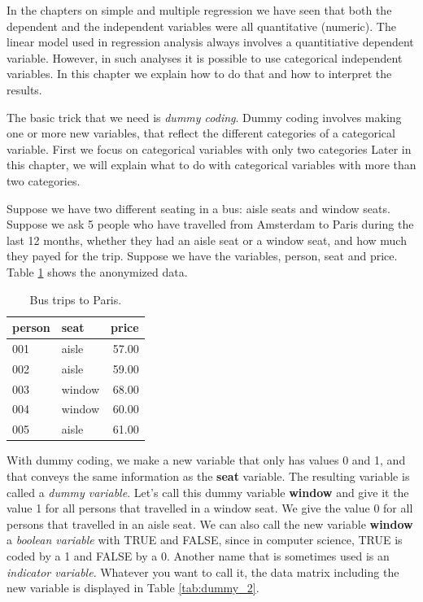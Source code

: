 \documentclass[]{report}\usepackage[]{graphicx}\usepackage[]{color}
\begin{document}
In the chapters on simple and multiple regression we have seen that both the dependent and the independent variables were all quantitative (numeric). The linear model used in regression analysis always involves a quantitiative dependent variable. However, in such analyses it is possible to use categorical independent variables. In this chapter we explain how to do that and how to interpret the results. 

The basic trick that we need is \textit{dummy coding}. Dummy coding involves making one or more new variables, that reflect the different categories of a categorical variable. First we focus on categorical variables with only two categories Later in this chapter, we will explain what to do with categorical variables with more than two categories. 

Suppose we have two different seating in a bus: aisle seats and window seats. Suppose we ask 5 people who have travelled from Amsterdam to Paris during the last 12 months, whether they had an aisle seat or a window seat, and how much they payed for the trip. Suppose we have the variables, person, seat and price. Table \ref{tab:dummy_1} shows the anonymized data.

\begin{table}[ht]
\centering
\caption{Bus trips to Paris.} 
\label{tab:dummy_1}
\begin{tabular}{llr}
  \hline
person & seat & price \\ 
  \hline
001 & aisle & 57.00 \\ 
  002 & aisle & 59.00 \\ 
  003 & window & 68.00 \\ 
  004 & window & 60.00 \\ 
  005 & aisle & 61.00 \\ 
   \hline
\end{tabular}
\end{table}



With dummy coding, we make a new variable that only has values 0 and 1, and that conveys the same information as the \textbf{seat} variable. The resulting variable is called a \textit{dummy variable}. Let's call this dummy variable \textbf{window} and give it the value 1 for all persons that travelled in a window seat. We give the value 0 for all persons that travelled in an aisle seat. We can also call the new variable \textbf{window} a \textit{boolean variable} with TRUE and FALSE, since in computer science, TRUE is coded by a 1 and FALSE by a 0. Another name that is sometimes used is an \textit{indicator variable}. Whatever you want to call it, the data matrix including the new variable is displayed in Table \ref{tab:dummy_2}.
\end{document}
